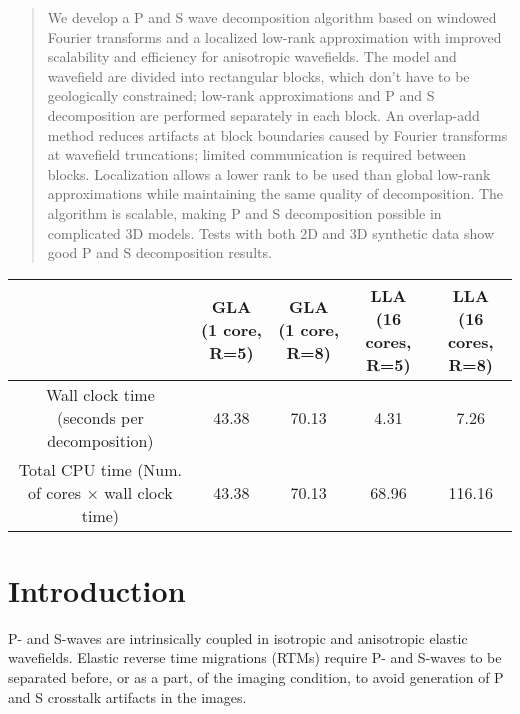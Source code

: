 \documentclass[manuscript,ulem,graphix,revised]{geophysics}
\begin{document}
\begin{abstract}
\indent\indent
We develop a P and S wave decomposition algorithm based on windowed Fourier transforms and a localized low-rank approximation with improved scalability and efficiency for anisotropic wavefields. The model and wavefield are divided into rectangular blocks, which don't have to be geologically constrained; low-rank approximations and P and S decomposition are performed separately in each block. An overlap-add method reduces artifacts at block boundaries caused by Fourier transforms at wavefield truncations; limited communication is required between blocks. Localization allows a lower rank to be used than global low-rank approximations while maintaining the same quality of decomposition. The algorithm is scalable, making P and S decomposition possible in complicated 3D models. Tests with both 2D and 3D synthetic data show good P and S decomposition results.

\end{abstract}
{
  \begin{center}
  \begin{small}
    \begin{tabular}{|c|c|c|c|c|}
      \hline
       &
      \makecell{GLA \\ (1 core, R=5)}&
      \makecell{GLA \\ (1 core, R=8)}&
      \makecell{LLA \\ (16 cores, R=5)}&
      \makecell{LLA \\ (16 cores, R=8)}\\
      \hline
      \makecell{Wall clock time \\(seconds per decomposition)}&
       43.38&
       70.13&
       4.31&
       7.26\\
      \hline
      \makecell{Total CPU time \\(Num. of cores  $\times$ wall clock time)}&
       43.38&
       70.13&
       68.96&
       116.16\\
      \hline
    \end{tabular}
  \end{small}
  \end{center}
}

\section{Introduction}

\indent\indent
P- and S-waves are intrinsically coupled in isotropic and anisotropic elastic wavefields. Elastic reverse time migrations (RTMs) require P- and S-waves to be separated before, or as a part, of the imaging condition, to avoid generation of P and S crosstalk artifacts in the images.
\end{document}

